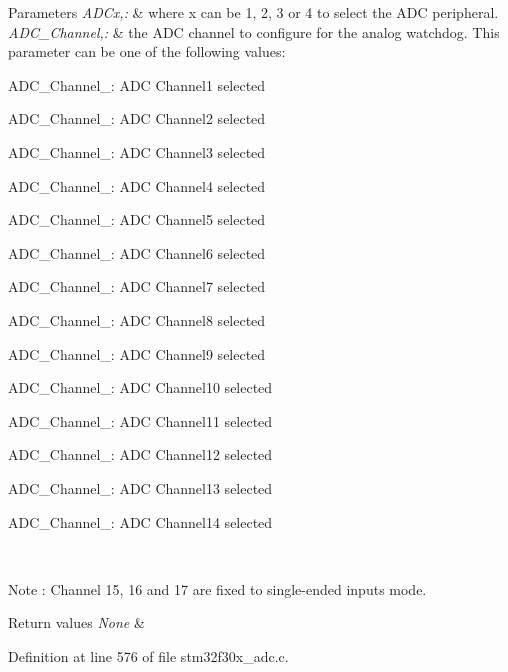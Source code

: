 \begin{DoxyParams}{Parameters}
{\em A\-D\-Cx,\-:} & where x can be 1, 2, 3 or 4 to select the A\-D\-C peripheral. \\
\hline
{\em A\-D\-C\-\_\-\-Channel,\-:} & the A\-D\-C channel to configure for the analog watchdog. This parameter can be one of the following values\-: \begin{DoxyItemize}
\item A\-D\-C\-\_\-\-Channel\-\_\-: A\-D\-C Channel1 selected \item A\-D\-C\-\_\-\-Channel\-\_\-: A\-D\-C Channel2 selected \item A\-D\-C\-\_\-\-Channel\-\_\-: A\-D\-C Channel3 selected \item A\-D\-C\-\_\-\-Channel\-\_\-: A\-D\-C Channel4 selected \item A\-D\-C\-\_\-\-Channel\-\_\-: A\-D\-C Channel5 selected \item A\-D\-C\-\_\-\-Channel\-\_\-: A\-D\-C Channel6 selected \item A\-D\-C\-\_\-\-Channel\-\_\-: A\-D\-C Channel7 selected \item A\-D\-C\-\_\-\-Channel\-\_\-: A\-D\-C Channel8 selected \item A\-D\-C\-\_\-\-Channel\-\_\-: A\-D\-C Channel9 selected \item A\-D\-C\-\_\-\-Channel\-\_\-: A\-D\-C Channel10 selected \item A\-D\-C\-\_\-\-Channel\-\_\-: A\-D\-C Channel11 selected \item A\-D\-C\-\_\-\-Channel\-\_\-: A\-D\-C Channel12 selected \item A\-D\-C\-\_\-\-Channel\-\_\-: A\-D\-C Channel13 selected \item A\-D\-C\-\_\-\-Channel\-\_\-: A\-D\-C Channel14 selected \end{DoxyItemize}
\\
\hline
\end{DoxyParams}
\begin{DoxyNote}{Note}
\-: Channel 15, 16 and 17 are fixed to single-\/ended inputs mode. 
\end{DoxyNote}

\begin{DoxyRetVals}{Return values}
{\em None} & \\
\hline
\end{DoxyRetVals}


Definition at line 576 of file stm32f30x\-\_\-adc.\-c.

